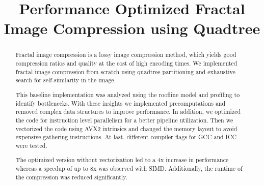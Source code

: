 \documentclass[letterpaper]{article}
\title{Performance Optimized Fractal Image Compression using Quadtree}
\begin{document}
%
\maketitle
%
%

\setlength{\abovedisplayskip}{1ex}
\setlength{\belowdisplayskip}{1ex}

\begin{abstract}
  Fractal image compression is a lossy image compression method, which yields
  good compression ratios and quality at the cost of high encoding times. We
  implemented fractal image compression from scratch using quadtree partitioning
  and exhaustive search for self-similarity in the image.

  This baseline implementation was analyzed using the roofline model and
  profiling to identify bottlenecks. With these insights we implemented
  precomputations and removed complex data structures to improve performance. In
  addition, we optimized the code for instruction level parallelism 
  for a better pipeline utilization. Then we vectorized the code
  using AVX2 intrinsics and changed the memory layout to avoid expensive
  gathering instructions. At last, different compiler flags for GCC and ICC were
  tested.

  The optimized version without vectorization led to a 4x increase in
  performance whereas a speedup of up to 8x was observed with SIMD.
  Additionally, the runtime of the compression was reduced significantly.

\end{abstract}










\end{document}
